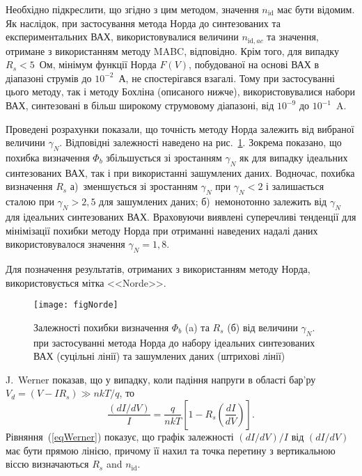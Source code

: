 Необхідно підкреслити, що згідно з цим методом, значення $n_\mathrm{id}$ має бути відомим.
Як наслідок, при застосування метода Норда до синтезованих та експериментальних ВАХ, використовувалися величини $n_{\mathrm{id},ac}$ та значення, отримане з використанням методу MABC, відповідно.
Крім того, для випадку  $R_s<5$~Ом, мінімум функції Норда $F(V)$, побудованої на основі ВАХ в діапазоні струмів до $10^{-2}$~А, не спостерігався взагалі.
Тому при застосуванні цього методу, так і методу Бохліна (описаного нижче), використовувалися набори ВАХ, синтезовані в більш широкому струмовому діапазоні, від $10^{-9}$ до $10^{-1}$~A.

Проведені розрахунки показали, що точність методу Норда залежить від вибраної величини $\gamma_N$.
Відповідні залежності наведено на рис.~\ref{figNorde}.
Зокрема показано, що похибка визначення $\Phi_b$ збільшується зі зростанням $\gamma_N$ як для випадку ідеальних синтезованих ВАХ, так і при використанні зашумлених даних.
Водночас, похибка визначення  $R_s$
а)~зменшується зі зростанням $\gamma_N$ при $\gamma_N<2$ і залишається сталою при $\gamma_N>2,5$ для зашумлених даних;
б)~немонотонно залежить від $\gamma_N$ для ідеальних синтезованих ВАХ.
Враховуючи виявлені суперечливі тенденції для мінімізації похибки методу Норда при отриманні наведених надалі даних використовувалося значення $\gamma_N=1,8$.

Для позначення результатів, отриманих з використанням методу Норда, використовується мітка <<Norde>>.

\begin{figure}
\center
\texttt{[image: figNorde]}%
\caption{\label{figNorde}
Залежності похибки визначення $\Phi_b$ (a) та $R_s$ (б)  від величини $\gamma_N$.
 при застосуванні метода Норда до набору ідеальних синтезованих ВАХ (суцільні лінії) та зашумлених даних (штрихові лінії)
}
\end{figure}

J.~Werner  \cite{Werner} показав, що у випадку, коли падіння напруги в області бар'ру $V_d=(V-IR_s)\gg nkT/q$, то
\begin{equation}
\label{eqWerner}
\frac{(dI/dV)}{I}=\frac{q}{nkT}\left[1-R_s\left(\frac{dI}{dV}\right)\right].
\end{equation}
Рівняння~(\ref{eqWerner}) показує, що графік  залежності   $(dI/dV)/I$  від $(dI/dV)$ має бути прямою лінією,
причому її нахил та точка перетину з вертикальною віссю визначаються $R_s$ and $n_\mathrm{id}$.


